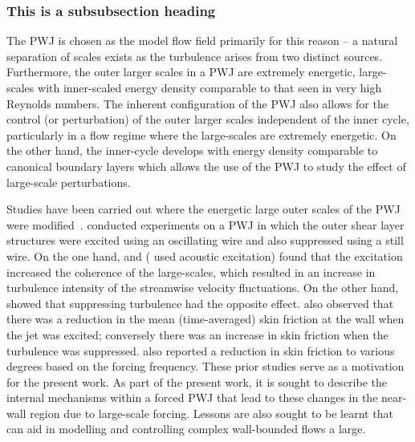 \subsubsection{This is a subsubsection heading}
The PWJ is chosen as the model flow field primarily for this reason -- a natural separation of scales exists as the turbulence arises from two distinct sources. Furthermore, the outer larger scales in a PWJ are extremely energetic, large-scales with inner-scaled energy density comparable to that seen in very high Reynolds numbers. The inherent configuration of the PWJ also allows for the control (or perturbation) of the outer larger scales independent of the inner cycle, particularly in a flow regime where the large-scales are extremely energetic.  On the other hand, the inner-cycle develops with energy density comparable to canonical boundary layers which allows the use of the PWJ to study the effect of large-scale perturbations. 

Studies have been carried out where the energetic large outer scales of the PWJ were modified~\cite{Katz1992a,Zhou1996a,Schober2000a}. \citet{Schober2000a} conducted experiments on a PWJ in which the outer shear layer structures were excited using an oscillating wire and also suppressed using a still wire. On the one hand, \citet{Schober2000a} and \citet{Zhou1996a} (\citet{Zhou1996a} used acoustic excitation) found that the excitation increased the coherence of the large-scales, which resulted in an increase in turbulence intensity of the streamwise velocity fluctuations. On the other hand, \citet{Schober2000a} showed that suppressing turbulence had the opposite effect. \citet{Schober2000a} also observed that there was a reduction in the mean (time-averaged) skin friction at the wall when the jet was excited; conversely there was an increase in skin friction when the turbulence was suppressed. \citet{Katz1992a} also reported a reduction in skin friction to various degrees based on the forcing frequency. These prior studies serve as a motivation for the present work. As part of the present work, it is sought to describe the internal mechanisms within a forced PWJ that lead to these changes in the near-wall region due to large-scale forcing. Lessons are also sought to be learnt that can aid in modelling and controlling complex wall-bounded flows a large.


